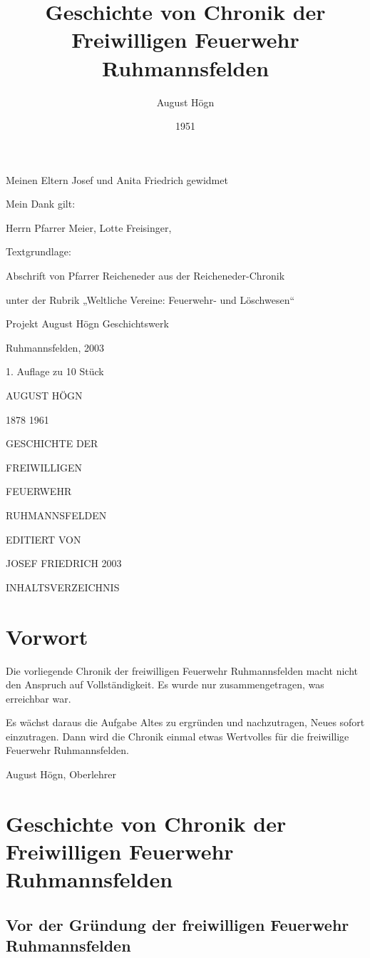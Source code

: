 \documentclass[12pt,a4paper]{book}
\author{August Högn}
\title{Geschichte von Chronik der Freiwilligen Feuerwehr Ruhmannsfelden}
\date{1951}
\begin{document}
\maketitle



Meinen Eltern Josef und Anita Friedrich gewidmet

Mein Dank gilt:

Herrn Pfarrer Meier, Lotte Freisinger,

Textgrundlage:

Abschrift von Pfarrer Reicheneder aus der Reicheneder-Chronik

unter der Rubrik „Weltliche Vereine: Feuerwehr- und Löschwesen“

Projekt August Högn Geschichtswerk

Ruhmannsfelden, 2003

1. Auflage zu 10 Stück

AUGUST HÖGN

1878 1961

GESCHICHTE DER

FREIWILLIGEN

FEUERWEHR

RUHMANNSFELDEN

EDITIERT VON

JOSEF FRIEDRICH 2003

INHALTSVERZEICHNIS

\tableofcontents

\part{Vorwort}

Die vorliegende Chronik der freiwilligen Feuerwehr Ruhmannsfelden macht nicht
den Anspruch auf Vollständigkeit. Es wurde nur zusammengetragen, was erreichbar
war.

Es wächst daraus die Aufgabe Altes zu ergründen und nachzutragen, Neues sofort
einzutragen. Dann wird die Chronik einmal etwas Wertvolles für die freiwillige
Feuerwehr Ruhmannsfelden.

August Högn, Oberlehrer

\part[Geschichte von Chronik der Feuerwehr]{Geschichte von Chronik der
Freiwilligen Feuerwehr Ruhmannsfelden}

\chapter{Vor der Gründung der freiwilligen Feuerwehr Ruhmannsfelden}
\end{document}
